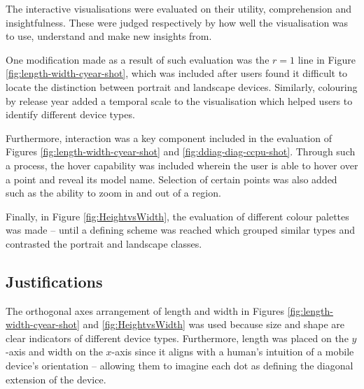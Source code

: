 \documentclass[conference]{IEEEtran}
\begin{document}

The interactive visualisations were evaluated on their utility, comprehension
and insightfulness. These were judged respectively by how well the visualisation
was to use, understand and make new insights from.

One modification made as a result of such evaluation was the $r=1$ line in
Figure \ref{fig:length-width-cyear-shot}, which was included after users
found it difficult to locate the distinction between portrait and landscape
devices. Similarly, colouring by release year added a temporal scale to the
visualisation which helped users to identify different device types.

Furthermore, interaction was a key component included in the evaluation of
Figures \ref{fig:length-width-cyear-shot} and \ref{fig:ddiag-diag-ccpu-shot}.
Through such a process, the hover capability was included wherein the user is
able to hover over a point and reveal its model name. Selection of certain
points was also added such as the ability to zoom in and out of a region.

Finally, in Figure \ref{fig:HeightvsWidth}, the evaluation of different colour
palettes was made -- until a defining scheme was reached which grouped similar
types and contrasted the portrait and landscape classes.

\subsection{Justifications}

The orthogonal axes arrangement of length and width in Figures
\ref{fig:length-width-cyear-shot} and \ref{fig:HeightvsWidth} was used because
size and shape are clear indicators of different device types. Furthermore,
length was placed on the $y$-axis and width on the $x$-axis since it aligns
with a human's intuition of a mobile device's orientation -- allowing them to
imagine each dot as defining the diagonal extension of the device.
\end{document}

